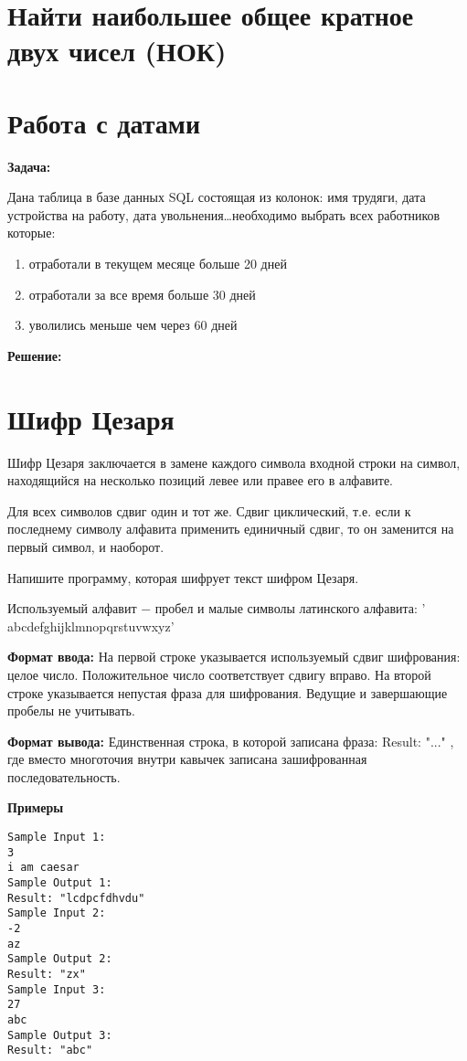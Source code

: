 \section{Найти наибольшее общее кратное двух чисел (НОК)}

\section{Работа с датами}
\textbf{Задача:}

Дана таблица в базе данных SQL состоящая из колонок: имя трудяги, дата устройства на работу, дата увольнения\dots необходимо выбрать всех работников которые:
\begin{enumerate}
\item отработали в текущем месяце больше 20 дней
\item отработали за все время больше 30 дней
\item уволились меньше чем через 60 дней
\end{enumerate}

\textbf{Решение:}

\section{Шифр Цезаря}
Шифр Цезаря заключается в замене каждого символа входной строки на символ, находящийся на несколько позиций левее или правее его в алфавите.

Для всех символов сдвиг один и тот же. Сдвиг циклический, т.е. если к последнему символу алфавита применить единичный сдвиг, то он заменится на первый символ, и наоборот.

Напишите программу, которая шифрует текст шифром Цезаря.

Используемый алфавит − пробел и малые символы латинского алфавита: ' abcdefghijklmnopqrstuvwxyz'

\textbf{Формат ввода:}
На первой строке указывается используемый сдвиг шифрования: целое число. Положительное число соответствует сдвигу вправо. На второй строке указывается непустая фраза для шифрования. Ведущие и завершающие пробелы не учитывать.

\textbf{Формат вывода:}
Единственная строка, в которой записана фраза: Result: "..." , где вместо многоточия внутри кавычек записана зашифрованная последовательность.

\textbf{Примеры}

\begin{lstlisting}
Sample Input 1:
3
i am caesar
Sample Output 1:
Result: "lcdpcfdhvdu"
Sample Input 2:
-2
az
Sample Output 2:
Result: "zx"
Sample Input 3:
27
abc
Sample Output 3:
Result: "abc"
\end{lstlisting}

